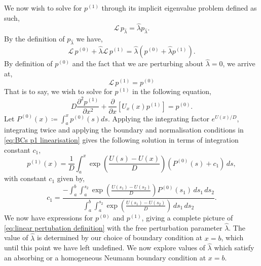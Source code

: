 \documentclass[11pt]{amsart}
\begin{document}
We now wish to solve for $p^{(1)}$ through its implicit eigenvalue problem defined as such,
\begin{equation*}
    \mathcal{L}\,p_{\hat{\lambda}} = \hat{\lambda} p_{\hat{\lambda}}.
\end{equation*}
By the definition of $p_{\hat{\lambda}}$ we have,
\begin{equation*}
     \mathcal{L}\,p^{(0)} + \hat{\lambda}\mathcal{L}\, p^{(1)} = \hat{\lambda}\left(p^{(0)} + \hat{\lambda} p^{(1)}\right).
\end{equation*}
By definition of $p^{(0)}$ and the fact that we are perturbing about $\hat{\lambda}=0$, we arrive at,
\begin{equation*}
    \mathcal{L}\,p^{(1)} =  p^{(0)}
\end{equation*}
That is to say, we wish to solve for $p^{(1)}$ in the following equation,
\begin{equation*}
    D\frac{\partial^2 p^{(1)}}{\partial x^2} + \frac{\partial}{\partial x}[U_x(x)p^{(1)}] =  p^{(0)}.
\end{equation*}
Let $P^{(0)}(x) \coloneq \int_{a}^x p^{(0)}(s) ds$. Applying the integrating factor $e^{U(x)/D}$, integrating twice and applying the boundary and normalisation conditions in \cref{eq:BCs p1 linearisation} gives the following solution in terms of integration constant $c_1$,
\begin{equation*}
    p^{(1)}(x) = \frac{1}{D}\int_{a}^x \exp\left(\frac{U(s)-U(x)}{D} \right) (P^{(0)}(s) + c_1) \, ds,
\end{equation*}
with constant $c_1$ given by,
\begin{equation*}
    c_1 = \frac{-\int_{a}^{b}\int_{a}^{s_2} \exp\left(\frac{U(s_1)-U(s_2)}{D} \right) P^{(0)}(s_1) \, ds_1 \, ds_2}{\int_{a}^{b}\int_{a}^{s_2} \exp\left(\frac{U(s_1)-U(s_2)}{D} \right) \, ds_1 \, ds_2}.
\end{equation*}
We now have expressions for $p^{(0)}$ and $p^{(1)}$, giving a complete picture of \cref{eq:linear pertubation definition} with the free perturbation parameter $\hat{\lambda}$. The value of $\hat{\lambda}$ is determined by our choice of boundary condition at $x=b$, which until this point we have left undefined. We now explore values of $\hat{\lambda}$ which satisfy an absorbing or a homogeneous Neumann boundary condition at $x=b$.
\end{document}
